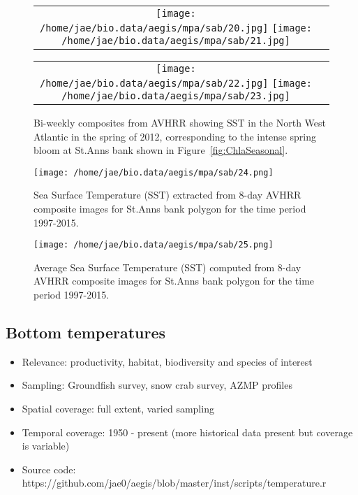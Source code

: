 \documentclass[letterpaper,portrait,11pt]{scrartcl}
\numberwithin{equation}{section}    %
\numberwithin{figure}{section}    %
\numberwithin{table}{section}       %
\begin{document}
\begin{figure}[h]
  \centering
  \begin{tabular}{cc}
    \texttt{[image: /home/jae/bio.data/aegis/mpa/sab/20.jpg]}
    \texttt{[image: /home/jae/bio.data/aegis/mpa/sab/21.jpg]}
  \end{tabular}
  \begin{tabular}{cc}
    \texttt{[image: /home/jae/bio.data/aegis/mpa/sab/22.jpg]}
    \texttt{[image: /home/jae/bio.data/aegis/mpa/sab/23.jpg]}
  \end{tabular}
  \caption{Bi-weekly composites from AVHRR showing SST in the North West Atlantic in the spring of 2012, corresponding to the intense spring bloom at St.Anns bank shown in Figure~\ref{fig:ChlaSeasonal}.}
  \label{fig:SSTfromAVHRRmap}
\end{figure}

\begin{figure}[h]
  \centering
  \texttt{[image: /home/jae/bio.data/aegis/mpa/sab/24.png]}
  \caption{Sea Surface Temperature (SST) extracted from 8-day AVHRR composite images for St.Anns bank polygon for the time period 1997-2015.}
  \label{fig:SSTfromAVHRRts}
\end{figure}

\begin{figure}[h]

  \centering
  \texttt{[image: /home/jae/bio.data/aegis/mpa/sab/25.png]}
  \caption{Average Sea Surface Temperature (SST) computed from 8-day AVHRR composite images for St.Anns bank polygon for the time period 1997-2015.}
  \label{fig:SstSeasonal}
\end{figure}


\afterpage{\clearpage}
\subsection{Bottom temperatures}

\begin{itemize}
  \item Relevance:  productivity, habitat, biodiversity and species of interest
  \item Sampling:  Groundfish survey, snow crab survey, AZMP profiles
  \item Spatial coverage: full extent, varied sampling
  \item Temporal coverage: 1950 - present (more historical data present but coverage is variable)
  \item Source code: https://github.com/jae0/aegis/blob/master/inst/scripts/temperature.r
\end{itemize}
\end{document}

